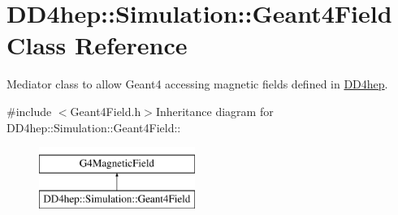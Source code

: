 \hypertarget{class_d_d4hep_1_1_simulation_1_1_geant4_field}{
\section{DD4hep::Simulation::Geant4Field Class Reference}
\label{class_d_d4hep_1_1_simulation_1_1_geant4_field}
}


Mediator class to allow Geant4 accessing magnetic fields defined in \hyperlink{namespace_d_d4hep}{DD4hep}.  


{\ttfamily \#include $<$Geant4Field.h$>$}Inheritance diagram for DD4hep::Simulation::Geant4Field::\begin{figure}[H]
\begin{center}
\leavevmode
\includegraphics[height=2cm]{class_d_d4hep_1_1_simulation_1_1_geant4_field}
\end{center}
\end{figure}
